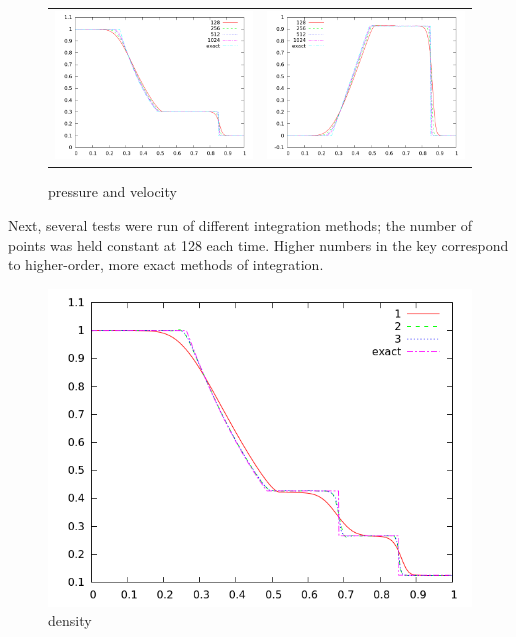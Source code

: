 \documentclass[10pt,preprint]{aastex}
\begin{document}
\begin{figure}
  \begin{center}
	\begin{tabular}{cc}
      \includegraphics[width=.425\textwidth]{prscellcomp_20} &
	  \includegraphics[width=.425\textwidth]{velcellcomp_20}
	\end{tabular}
  \end{center}
  \caption{pressure and velocity}
  \label{fig:pvcellcomp}
\end{figure}

    
Next, several tests were run of different integration methods; the number of points was held constant at 128 each time. Higher numbers in the key correspond to higher-order, more exact methods of integration. 

\begin{figure}[h]
  \begin{center}
    \includegraphics[width=.78\textwidth]{den128comp_20}
  \end{center}
  \caption{density}
\end{figure}
\end{document}
